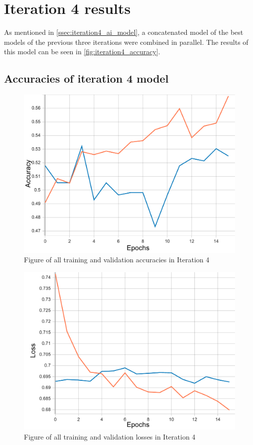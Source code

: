 \section{Iteration 4 results}\label{iteration4_results}
As mentioned in \autoref{ssec:iteration4_ai_model}, a concatenated model of the best models of the previous 
three iterations were combined in parallel. The results of this model can be seen in
\autoref{fig:iteration4_accuracy}.

\subsection{Accuracies of iteration 4 model}

\begin{figure}[ht]
    \centering
    \includegraphics[width=0.95\columnwidth]{figures/results/concat/concat_acc.pdf}
    \caption[Accuracies for Iteration 4]{Figure of all training and validation accuracies in Iteration 4}
    \label{fig:iteration4_accuracy}
\end{figure}
\FloatBarrier

\begin{figure}[ht]
    \centering
    \includegraphics[width=0.95\columnwidth]{figures/results/concat/concat_loss.pdf}
    \caption[Losses for Iteration 4]{Figure of all training and validation losses in Iteration 4}
    \label{fig:iteration4_loss}
\end{figure}
\FloatBarrier

